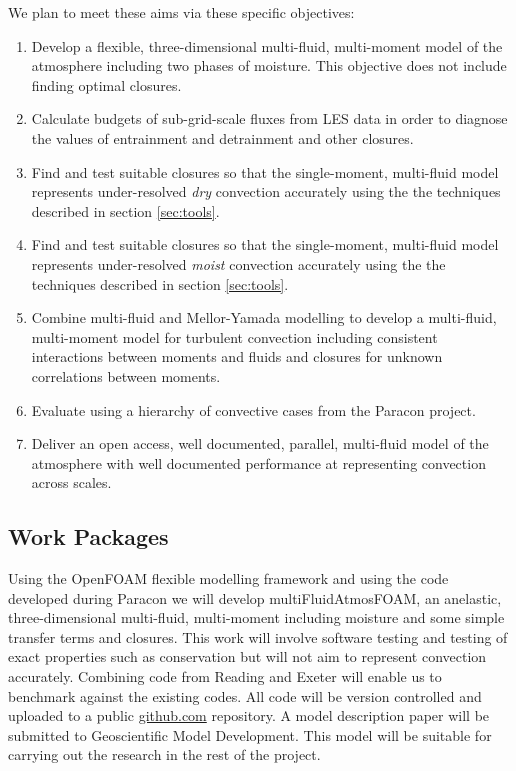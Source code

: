 \documentclass[11pt,a4paper]{article}
\begin{document}
We plan to meet these aims via these specific objectives:

\begin{enumerate}
\item\label{it:model} Develop a flexible, three-dimensional multi-fluid, multi-moment model of the atmosphere including two phases of moisture. This objective does not include finding optimal closures.

\item\label{it:budgets} Calculate budgets of sub-grid-scale fluxes from LES data in order to diagnose the values of entrainment and detrainment and other closures.

\item Find and test suitable closures so that the single-moment, multi-fluid model represents under-resolved {\it dry} convection accurately using the the techniques described in section \ref{sec:tools}.

\item Find and test suitable closures so that the single-moment, multi-fluid model represents under-resolved {\it moist} convection accurately using the the techniques described in section \ref{sec:tools}. 

\item Combine multi-fluid and Mellor-Yamada modelling to develop a  multi-fluid, multi-moment model for turbulent convection including consistent interactions between moments and fluids and closures for unknown correlations between moments.

\item Evaluate using a hierarchy of convective cases from the Paracon project.

\item Deliver an open access, well documented, parallel, multi-fluid model of the atmosphere with well documented performance at representing convection across scales.
\end{enumerate}

\subsection{Work Packages}
\label{sec:WPs}


Using the OpenFOAM flexible modelling framework and using the code developed during Paracon we will develop multiFluidAtmosFOAM, an anelastic, three-dimensional multi-fluid, multi-moment including moisture and some simple transfer terms and closures. This work will involve software testing and testing of exact properties such as conservation but will not aim to represent convection accurately. Combining code from Reading and Exeter will enable us to benchmark against the existing codes. All code will be version controlled and uploaded to a public \url{github.com} repository. A model description paper will be submitted to Geoscientific Model Development. This model will be suitable for carrying out the research in the rest of the project. 
\end{document}
